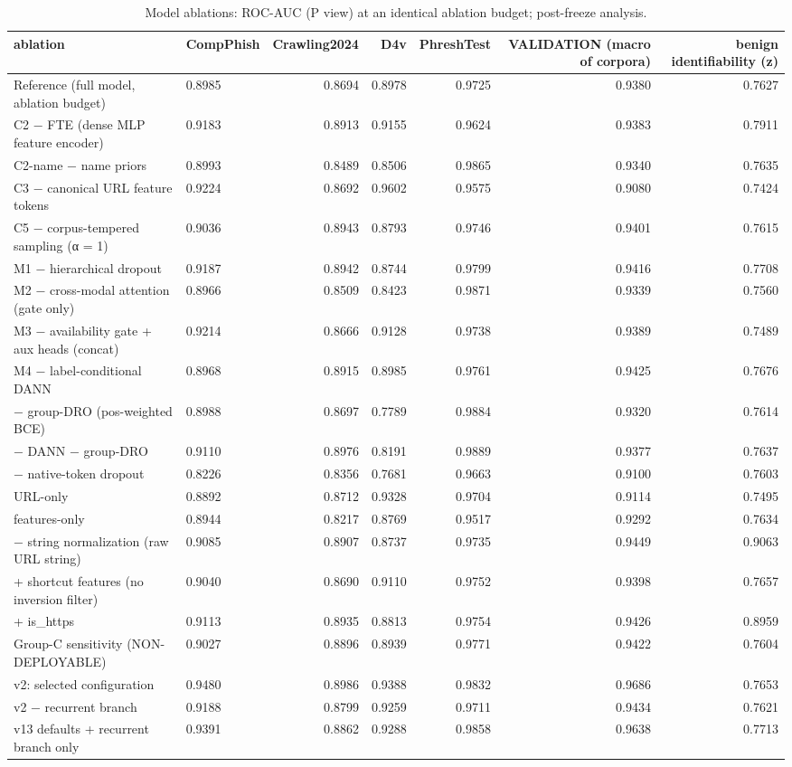 \begin{table}[t]
\centering
\scriptsize
\caption{Model ablations: ROC-AUC (P view) at an identical ablation budget; post-freeze analysis.}
\label{tab:ablations}
\begin{tabular}{llrrrrr}
\toprule
ablation & CompPhish & Crawling2024 & D4v & PhreshTest & VALIDATION (macro of corpora) & benign identifiability (z) \\
\midrule
Reference (full model, ablation budget) & 0.8985 & 0.8694 & 0.8978 & 0.9725 & 0.9380 & 0.7627 \\
C2 − FTE (dense MLP feature encoder) & 0.9183 & 0.8913 & 0.9155 & 0.9624 & 0.9383 & 0.7911 \\
C2-name − name priors & 0.8993 & 0.8489 & 0.8506 & 0.9865 & 0.9340 & 0.7635 \\
C3 − canonical URL feature tokens & 0.9224 & 0.8692 & 0.9602 & 0.9575 & 0.9080 & 0.7424 \\
C5 − corpus-tempered sampling (α = 1) & 0.9036 & 0.8943 & 0.8793 & 0.9746 & 0.9401 & 0.7615 \\
M1 − hierarchical dropout & 0.9187 & 0.8942 & 0.8744 & 0.9799 & 0.9416 & 0.7708 \\
M2 − cross-modal attention (gate only) & 0.8966 & 0.8509 & 0.8423 & 0.9871 & 0.9339 & 0.7560 \\
M3 − availability gate + aux heads (concat) & 0.9214 & 0.8666 & 0.9128 & 0.9738 & 0.9389 & 0.7489 \\
M4 − label-conditional DANN & 0.8968 & 0.8915 & 0.8985 & 0.9761 & 0.9425 & 0.7676 \\
− group-DRO (pos-weighted BCE) & 0.8988 & 0.8697 & 0.7789 & 0.9884 & 0.9320 & 0.7614 \\
− DANN − group-DRO & 0.9110 & 0.8976 & 0.8191 & 0.9889 & 0.9377 & 0.7637 \\
− native-token dropout & 0.8226 & 0.8356 & 0.7681 & 0.9663 & 0.9100 & 0.7603 \\
URL-only & 0.8892 & 0.8712 & 0.9328 & 0.9704 & 0.9114 & 0.7495 \\
features-only & 0.8944 & 0.8217 & 0.8769 & 0.9517 & 0.9292 & 0.7634 \\
− string normalization (raw URL string) & 0.9085 & 0.8907 & 0.8737 & 0.9735 & 0.9449 & 0.9063 \\
+ shortcut features (no inversion filter) & 0.9040 & 0.8690 & 0.9110 & 0.9752 & 0.9398 & 0.7657 \\
+ is\_https & 0.9113 & 0.8935 & 0.8813 & 0.9754 & 0.9426 & 0.8959 \\
Group-C sensitivity (NON-DEPLOYABLE) & 0.9027 & 0.8896 & 0.8939 & 0.9771 & 0.9422 & 0.7604 \\
v2: selected configuration & 0.9480 & 0.8986 & 0.9388 & 0.9832 & 0.9686 & 0.7653 \\
v2 − recurrent branch & 0.9188 & 0.8799 & 0.9259 & 0.9711 & 0.9434 & 0.7621 \\
v13 defaults + recurrent branch only & 0.9391 & 0.8862 & 0.9288 & 0.9858 & 0.9638 & 0.7713 \\
\bottomrule
\end{tabular}
\end{table}